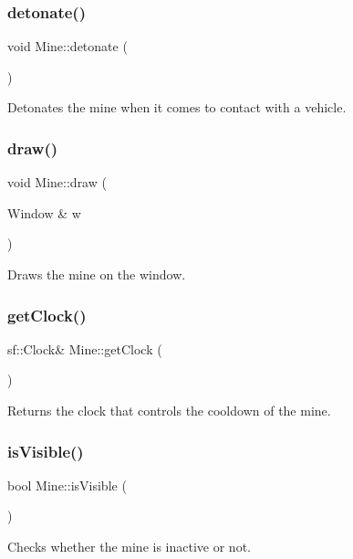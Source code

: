 \subsubsection{\texorpdfstring{detonate()}{detonate()}}
{\footnotesize\ttfamily void Mine\+::detonate (\begin{DoxyParamCaption}{ }\end{DoxyParamCaption})}

Detonates the mine when it comes to contact with a vehicle. \hypertarget{classMine_a6305c033929abf20ce4b1c212177d5ec}{}\label{classMine_a6305c033929abf20ce4b1c212177d5ec} 
\subsubsection{\texorpdfstring{draw()}{draw()}}
{\footnotesize\ttfamily void Mine\+::draw (\begin{DoxyParamCaption}\item[{Window \&}]{w }\end{DoxyParamCaption})}

Draws the mine on the window. \hypertarget{classMine_a21cdef836d82c5fa0bed3125b338181b}{}\label{classMine_a21cdef836d82c5fa0bed3125b338181b} 
\subsubsection{\texorpdfstring{get\+Clock()}{getClock()}}
{\footnotesize\ttfamily sf\+::\+Clock\& Mine\+::get\+Clock (\begin{DoxyParamCaption}{ }\end{DoxyParamCaption})}

Returns the clock that controls the cooldown of the mine. \hypertarget{classMine_a697a4d8d3872b2155f85ea85347dadda}{}\label{classMine_a697a4d8d3872b2155f85ea85347dadda} 
\subsubsection{\texorpdfstring{is\+Visible()}{isVisible()}}
{\footnotesize\ttfamily bool Mine\+::is\+Visible (\begin{DoxyParamCaption}{ }\end{DoxyParamCaption})}

Checks whether the mine is inactive or not. \hypertarget{classMine_a8f5acea497c11f9882c74c6e3f3a1554}{}\label{classMine_a8f5acea497c11f9882c74c6e3f3a1554} 
